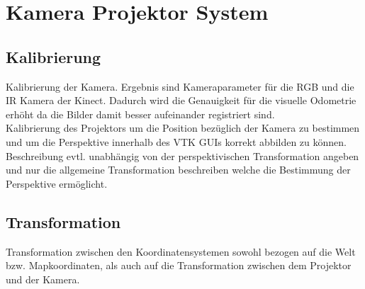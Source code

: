 \chapter{Kamera Projektor System}
\section{Kalibrierung}
Kalibrierung der Kamera. Ergebnis sind Kameraparameter für die RGB und die IR Kamera der Kinect. Dadurch wird die Genauigkeit für die visuelle Odometrie erhöht da die Bilder damit besser aufeinander registriert sind.\\
Kalibrierung des Projektors um die Position bezüglich der Kamera zu bestimmen und um die Perspektive innerhalb des VTK GUIs korrekt abbilden zu können. Beschreibung evtl. unabhängig von der perspektivischen Transformation angeben und nur die allgemeine Transformation beschreiben welche die Bestimmung der Perspektive ermöglicht.

\section{Transformation}
Transformation zwischen den Koordinatensystemen sowohl bezogen auf die Welt bzw. Mapkoordinaten, als auch auf die Transformation zwischen dem Projektor und der Kamera.